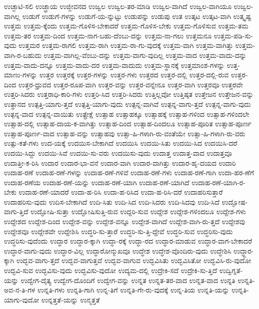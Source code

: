 {ಉಚ್ಛಾಟಿ-ಸಲಿ
ಉಚ್ಛ್ರಾಯ
ಉಜ್ಜೀವನದ
ಉಜ್ವಲ
ಉಜ್ವಲ-ತರ-ಮಾಡಿ
ಉಜ್ವಲ-ವಾಗಿದೆ
ಉಜ್ವಲ-ವಾಗಿಯೂ
ಉಜ್ವಲ-ವಾಗಿಲ್ಲ
ಉಡುಗೆ
ಉಡುಗೆ-ಗಳನ್ನು
ಉಡುಗೆ-ಯ-ನ್ನುಟ್ಟು
ಉಡುಪನ್ನು
ಉಡುಪು
ಉತ
ಉತ್ಕಟ
ಉತ್ಕಟ-ವಾಗಿ
ಉತ್ಕೃಷ್ಟ
ಉತ್ತಮ
ಉತ್ತಮ-ಕ್ಕೆಂದು
ಉತ್ತಮ-ಗೊಳಿಸ-ಬೇಕಾದರೆ
ಉತ್ತಮ-ಗೊಳಿಸ-ಬೇಕು
ಉತ್ತಮ-ಗೊಳಿಸುವ
ಉತ್ತಮ-ತಮ
ಉತ್ತಮ-ತರ
ಉತ್ತಮ-ದಿಂದ
ಉತ್ತಮ-ನಾಗ-ಬಹು-ದೆಂಬು-ದನ್ನು
ಉತ್ತಮ-ನಾ-ಗಲು
ಉತ್ತಮನೂ
ಉತ್ತಮ-ಪಡಿ-ಸು-ವುದು
ಉತ್ತಮರ
ಉತ್ತಮ-ರಾಗಲಿ
ಉತ್ತಮ-ರಾಗಿ
ಉತ್ತಮ-ರಾ-ಗು-ವುದಕ್ಕೆ
ಉತ್ತಮ-ವಾಗಿ
ಉತ್ತಮ-ವಾಗಿತ್ತು
ಉತ್ತಮ-ವಾಗಿ-ರ-ಬಹುದು
ಉತ್ತಮ-ವಾಗಿಲ್ಲ-ವೆಂಬು-ದನ್ನು
ಉತ್ತಮ-ವಾಗು-ವುದಿಲ್ಲ
ಉತ್ತಮ-ವಾದ
ಉತ್ತಮ-ವಾದು-ದನ್ನು
ಉತ್ತಮ-ವಾದು-ದನ್ನೂ
ಉತ್ತಮ-ವಾದು-ದರ
ಉತ್ತಮ-ವಾದುದು
ಉತ್ತಮ-ಸ್ಥಾನಕ್ಕೆ
ಉತ್ತಮಾಂಶ-ಗಳನ್ನು
ಉತ್ತ-ಮಾಣು-ಗಳನ್ನು
ಉತ್ತರ
ಉತ್ತರಕ್ಕೆ
ಉತ್ತರ-ಗಳನ್ನು
ಉತ್ತರ-ಗಳು
ಉತ್ತರದ
ಉತ್ತರ-ದಲ್ಲಿ
ಉತ್ತರ-ದಲ್ಲಿ-ರುವ
ಉತ್ತರ-ದಿಂದ
ಉತ್ತರ-ಧ್ರುವದ
ಉತ್ತರ-ರೂಪ-ವಾಗಿ
ಉತ್ತರ-ವನ್ನು
ಉತ್ತರ-ವನ್ನೇನೂ
ಉತ್ತರ-ವಾಗಿ
ಉತ್ತರವೂ
ಉತ್ತರವೇ
ಉತ್ತರಿ-ಸಿದರು
ಉತ್ತರಾಧಿ-ಕಾರಿ-ಗಳು
ಉತ್ತರಿ-ಸಿದ
ಉತ್ತರಿ-ಸಿದರು
ಉತ್ತಿಲ್ಲವೋ
ಉತ್ತಿಷ್ಠತ
ಉತ್ತೇಜನ
ಉತ್ತೇಜನ-ವನ್ನು
ಉತ್ಥಾನದ
ಉತ್ಪತ್ತಿ-ಯಾಗು-ತ್ತದೆ
ಉತ್ಪತ್ತಿ-ಯಾಗು-ವುದು
ಉತ್ಪನ್ನ-ವಾಗಿವೆ
ಉತ್ಪನ್ನ-ವಾಗು-ತ್ತದೆ
ಉತ್ಪನ್ನ-ವಾಗು-ವುದು
ಉತ್ಪನ್ನ-ವಾದ
ಉತ್ಪನ್ನ-ವಾಯಿತು
ಉತ್ಪ್ರೇಕ್ಷೆ
ಉತ್ಸಾಹ
ಉತ್ಸಾಹಕ್ಕೂ
ಉತ್ಸಾಹಕ್ಕೆ
ಉತ್ಸಾಹ-ಗಳಿಂದ
ಉತ್ಸಾಹ-ಗಳಿಂದಲೇ
ಉತ್ಸಾಹ-ದಲ್ಲಿ
ಉತ್ಸಾಹ-ದಾಯ-ಕ-ವಾಗಿತ್ತು
ಉತ್ಸಾಹ-ದಿಂದ
ಉತ್ಸಾಹ-ದಿಂದಲೂ
ಉತ್ಸಾಹ-ಪೂರಿತ
ಉತ್ಸಾಹ-ಪೂರ್ಣ
ಉತ್ಸಾಹ-ಪೂರ್ಣ-ವಾದ
ಉತ್ಸಾಹ-ವನ್ನು
ಉತ್ಸಾಹವು
ಉತ್ಸಾ-ಹಿ-ಗಳಾಗಿ-ರು-ವಂತೆಯೇ
ಉತ್ಸಾ-ಹಿ-ಗಳಾಗಿ-ರು-ವರು
ಉತ್ಸು-ಕತೆ-ಗಳು
ಉದ-ಯಕ್ಕೆ
ಉದಯಿಸ-ಬೇಕಾಗಿದೆ
ಉದಯಿಸಿ
ಉದಯಿ-ಸಿತು
ಉದಯಿ-ಸಿದ
ಉದಯಿಸಿ-ದರೆ
ಉದಯಿ-ಸಿದ್ದು
ಉದಯಿ-ಸಿವೆ
ಉದಯಿ-ಸು-ವರು
ಉದಯಿಸು-ವುದು
ಉದಾತ್ತ
ಉದಾತ್ತ-ವಾದ
ಉದಾತ್ತವೂ
ಉದಾತ್ತೀ-ಕ-ರಿಸಿ
ಉದಾರ
ಉದಾರ-ಭಾ-ವನೆ
ಉದಾರ-ವಾಗಿ
ಉದಾರ-ವಾಗಿತ್ತು
ಉದಾರ-ಹೃ-ದಯದ
ಉದಾರಿ
ಉದಾಹ-ರಣೆ
ಉದಾಹ-ರಣೆ-ಗಳನ್ನು
ಉದಾಹ-ರಣೆ-ಗಳಿವೆ
ಉದಾಹ-ರಣೆ-ಗಳು
ಉದಾಹ-ರಣೆ-ಗಾಗಿ
ಉದಾ-ಹರ-ಣೆಗೆ
ಉದಾಹ-ರಣೆಯ
ಉದಾಹ-ರಣೆ-ಯನ್ನು
ಉದಾಹ-ರಣೆ-ಯಾಗಿ
ಉದಾಹ-ರಣೆ-ಯಾಗಿದೆ
ಉದಾಹ-ರಣೆ-ಯಾಗಿ-ರ-ಬೇಕು
ಉದಾಹ-ರಣೆ-ಯಾದರೆ
ಉದಾ-ಹ-ರಿಸಿ
ಉದಾ-ಹ-ರಿಸಿದ
ಉದಾ-ಹ-ರಿಸಿ-ದರೆ
ಉದಾಹರಿಸುತ್ತಾರೆ
ಉದಾಹರಿಸು-ವುದು
ಉದಿಸ-ಬೇಕಾಗಿದೆ
ಉದಿ-ಸಿತು
ಉದಿ-ಸಿದ
ಉದಿ-ಸಿದರು
ಉದಿ-ಸಿದವು
ಉದಿ-ಸಿದೆ
ಉದ್ಘೋಷ-ವಾಗು-ತ್ತಿದೆ
ಉದ್ಘೋಷಿ-ಸುತ್ತಾ
ಉದ್ಘೋಷಿಸುತ್ತಿ-ರುವ
ಉದ್ದರಿ-ಸುವ
ಉದ್ದೇಶ
ಉದ್ದೇಶ-ಗಳಿಂದಲೂ
ಉದ್ದೇಶ-ಗಳು
ಉದ್ದೇಶದ
ಉದ್ದೇಶ-ದಿಂದ
ಉದ್ದೇಶ-ವನ್ನು
ಉದ್ದೇಶ-ವನ್ನೂ
ಉದ್ದೇಶ-ವಾಗಿದೆ
ಉದ್ದೇಶ-ವಾಗಿ-ರು-ತ್ತದೆ
ಉದ್ದೇಶವು
ಉದ್ದೇಶವೂ
ಉದ್ದೇಶವೇ
ಉದ್ದೇಶಿಸಿ
ಉದ್ಧರಿ-ಸು-ತ್ತಾರೆ
ಉದ್ಧರಿ-ಸು-ತ್ತಿ-ದ್ದೇವೆ
ಉದ್ಧರಿ-ಸುವ
ಉದ್ಧರಿಸು-ವುದು
ಉದ್ಧರಿಸು-ವುದೆಂದು
ಉದ್ಧಾರ
ಉದ್ಧಾರ-ಕ್ಕಾಗಿ
ಉದ್ಧಾ-ರಕ್ಕೆ
ಉದ್ಧಾ-ರದ
ಉದ್ಧಾರ-ಮಾಡುವ
ಉದ್ಧಾರ-ವಾಗ-ಬೇಕಾದರೆ
ಉದ್ಧಾರ-ವಾಗು-ವುದು
ಉದ್ಧಾರ-ವಿಲ್ಲ
ಉದ್ಧಾರೋನ್ಮುಖವೂ
ಉದ್ಧೇಶ
ಉದ್ಧೇಶ-ವೊಂದಿರು-ವುದು
ಉದ್ಧೇಶಿಸಿ
ಉದ್ಧ್ದಾರ-ಕ್ಕಾಗಿ
ಉದ್ಭವ-ವಾಗು-ತ್ತದೆ
ಉದ್ಭವ-ವಾಗುತ್ತವೆ
ಉದ್ಭವ-ವಾಗುವ
ಉದ್ಭವಿಸಿತು
ಉದ್ಭವಿಸಿತೋ
ಉದ್ಭವಿಸಿ-ರು-ವುದೋ
ಉದ್ಭವಿ-ಸುವ
ಉದ್ಭವಿಸು-ವುದು
ಉದ್ಭವಿಸು-ವುದೋ
ಉದ್ಯಮ-ದಲ್ಲಿ
ಉದ್ರೇಕಿ-ಸದೆ
ಉದ್ರೇಕಿ-ಸು-ತ್ತಿದೆ
ಉದ್ವಿಗ್ನತೆ-ಯನ್ನು
ಉದ್ವೇಗ-ದೈತ್ಯ
ಉದ್ವೇಗ-ದೊಂದಿಗೆ
ಉದ್ವೇಗ-ವನ್ನು
ಉನ್ನತ
ಉನ್ನತ-ತರ-ವಾದ
ಉನ್ನತ-ವಾದ
ಉನ್ನತಿ
ಉನ್ನತಿ-ಅವ-ನ-ತಿ-ಗಳ
ಉನ್ನತಿ-ಗಳು
ಉನ್ನತಿ-ಗಾಗಿ
ಉನ್ನ-ತಿಗೆ
ಉನ್ನತಿ-ಗೇ-ರು-ವುದಕ್ಕೆ
ಉನ್ನ-ತಿಯ
ಉನ್ನತಿ-ಯನ್ನು
ಉನ್ನತಿ-ಯಾಗು-ವುದೋ
ಉನ್ನತ್ತತೆ-ಯನ್ನು
ಉನ್ಮತ್ತತೆ
}
